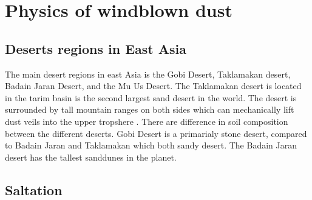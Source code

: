\section{Physics of windblown dust}

\subsection{Deserts regions in East Asia}
The main desert regions in east Asia is the Gobi Desert, Taklamakan desert, Badain Jaran Desert,  and the Mu Us Desert. The Taklamakan desert is located in the tarim basin is the second largest sand desert in the world. The desert is surrounded by tall mountain ranges on both sides which can mechanically lift dust veils into the upper tropshere \parencite{yumimoto_elevated_2009}.   There are difference in soil composition between the different deserts. Gobi Desert is a primarialy stone desert, compared to Badain Jaran and Taklamakan which both sandy desert. The Badain Jaran desert has the tallest sanddunes in the planet. 
\subsection{Saltation}